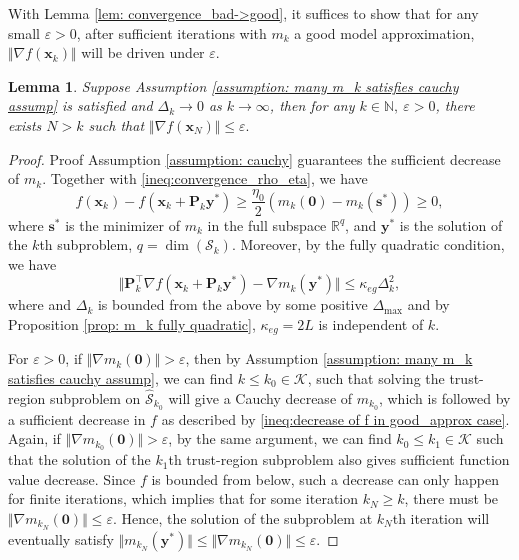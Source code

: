 \documentclass[colorlinks=true, linkcolor=blue, citecolor=blue, urlcolor=blue]{article}
\theoremstyle{plain}
\newtheorem{lemma}[theorem]{Lemma}
\theoremstyle{definition}
\theoremstyle{remark}
\newcommand{\eps}{\varepsilon}
\begin{document}
    With Lemma \ref{lem: convergence_bad->good}, it suffices to show that for any small $\eps>0$,
    after sufficient iterations with $m_k$ a good model approximation, $\Vert\nabla f(\bm x_k)\Vert$ will be driven under $\eps$.   
    \begin{lemma}
        Suppose Assumption \ref{assumption: many m_k satisfies cauchy assump} is satisfied and $\Delta_k\to0$ as $k\to \infty$, then for any $k\in\mathbb{N},\ \eps>0$, there exists $N>k$ such that $\Vert\nabla f(\bm x_N)\Vert\leq \eps.$  
    \end{lemma}
    
    \begin{proof}{Proof}
       Assumption \ref{assumption: cauchy} guarantees the sufficient decrease of $m_k$. Together with \eqref{ineq:convergence_rho_eta}, we have \begin{equation}\label{ineq:decrease of f in good_approx case}
        f(\bm{x}_k)-f(\bm{x}_k+\bm{P}_k \bm y^{*})\geq \frac{\eta_0}{2}\left(m_k(\bm 0)-m_k(\bm s^*)\right)\geq 0,
    \end{equation}
    where $\bm s^*$ is the minimizer of $m_k$ in the full subspace $\mathbb{R}^q$, and $\bm y^*$ is the solution of the $k$th subproblem, $q=\dim(\mathcal{S}_k)$. Moreover, by the fully quadratic condition, we have
    \begin{equation}\label{ineq:fully quadratic in convergence_good_approx}
        \Vert \bm P_k^\top\nabla f(\bm x_k+\bm P_k\bm y^*)-\nabla m_k(\bm y^*)\Vert\leq \kappa_{eg}\Delta_k^2,
    \end{equation}
    where and $\Delta_k$ is bounded from the above by some positive $\Delta_{\max}$ and by Proposition \ref{prop: m_k fully quadratic}, $\kappa_{eg}=2L$ is independent of $k$.

    For $\eps>0$, if $\Vert\nabla m_{k}(\bm 0)\Vert>\eps$, then by Assumption \ref{assumption: many m_k satisfies cauchy assump}, we can find $k\leq k_0\in\mathcal{K}$, such that solving the trust-region subproblem on $\hat{\mathcal{S}}_{k_0}$ will give a Cauchy decrease of $m_{k_0}$, which is followed by a sufficient decrease in $f$ as described by \eqref{ineq:decrease of f in good_approx case}. Again, if $\Vert\nabla m_{k_0}(\bm 0)\Vert>\eps$, by the same argument, we can find $k_0\leq k_1\in\mathcal{K}$ such that the solution of the $k_1$th trust-region subproblem also gives sufficient function value decrease. Since $f$ is bounded from below, such a decrease can only happen for finite iterations, which implies that for some iteration $k_N\geq k$, there must be $\Vert\nabla m_{k_N}(\bm 0)\Vert\leq \eps$. Hence, the solution of the subproblem at $k_N$th iteration will eventually satisfy $\Vert m_{k_N}(\bm y^*)\Vert\leq\Vert\nabla m_{k_N}(\bm 0)\Vert\leq \eps$. 


\end{proof}
\end{document}
